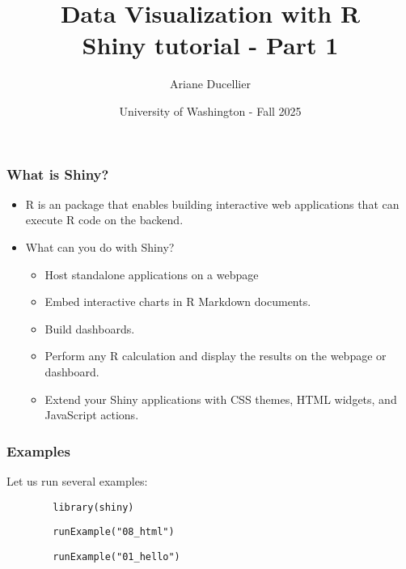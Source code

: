 \documentclass{beamer}
\title[Data Visualization with R - Shiny tutorial - Part 1]{Data Visualization with R \\ Shiny tutorial - Part 1}
\author{Ariane Ducellier}
\date{University of Washington - Fall 2025}
\begin{document}
	\begin{frame}
		\titlepage
	\end{frame}

	\begin{frame}
		\frametitle{What is Shiny?}

		\begin{itemize}
			\item R is an package that enables building interactive web applications that can execute R code on the backend.

			\vspace{1em}

			\item What can you do with Shiny?
			\begin{itemize}
				\item Host standalone applications on a webpage
				\item Embed interactive charts in R Markdown documents.
				\item Build dashboards.
				\item Perform any R calculation and display the results on the webpage or dashboard.
				\item Extend your Shiny applications with CSS themes, HTML widgets, and JavaScript actions.
			\end{itemize}
		\end{itemize}
		
	\end{frame}

	\begin{frame}[fragile]
		\frametitle{Examples}

		Let us run several examples:

		\vspace{2em}

		\begin{exampleblock}{}
		\begin{BVerbatim}
		library(shiny)
		\end{BVerbatim}
		\end{exampleblock}{}

		\vspace{2em}

		\begin{exampleblock}{}
		\begin{BVerbatim}
		runExample("08_html")
		\end{BVerbatim}
		\end{exampleblock}{}

		\vspace{2em}

		\begin{exampleblock}{}
		\begin{BVerbatim}
		runExample("01_hello")
		\end{BVerbatim}
		\end{exampleblock}{}

	\end{frame}
\end{document}
